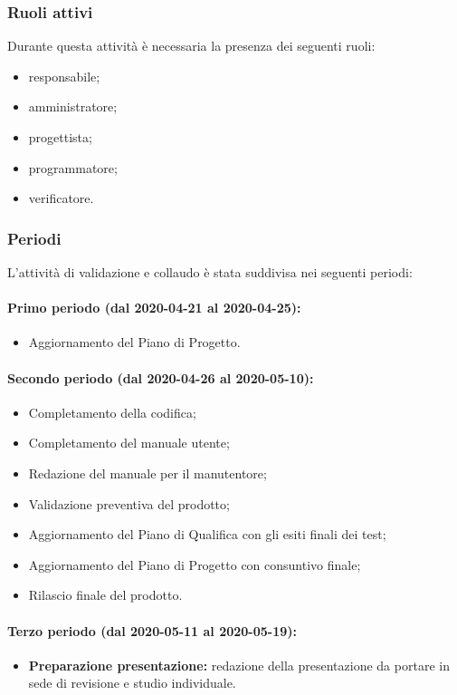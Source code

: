			\subsubsection{Ruoli attivi}
			
			Durante questa attività è necessaria la presenza dei seguenti ruoli:
			\begin{itemize}
				\item responsabile;
				\item amministratore;
				\item progettista;
				\item programmatore;
				\item verificatore.
			\end{itemize}
			
			\subsubsection{Periodi}
			
				L'attività di validazione e collaudo è stata suddivisa nei seguenti periodi:
		
				\paragraph{Primo periodo (dal 2020-04-21 al 2020-04-25):}
				
					\begin{itemize}
					 	\item Aggiornamento del Piano di Progetto.
					\end{itemize} 	
				
				\paragraph{Secondo periodo (dal 2020-04-26 al 2020-05-10):}
				
					\begin{itemize}
						\item Completamento della codifica;
						\item Completamento del manuale utente;
						\item Redazione del manuale per il manutentore;
						\item Validazione preventiva del prodotto;
						\item Aggiornamento del Piano di Qualifica con gli esiti finali dei test;
						\item Aggiornamento del Piano di Progetto con consuntivo finale;
						\item Rilascio finale del prodotto.
					\end{itemize}
		
				\paragraph{Terzo periodo (dal 2020-05-11 al 2020-05-19):}
				
					\begin{itemize}
						\item \textbf{Preparazione presentazione:} redazione della presentazione da portare in sede di revisione e studio individuale.
					\end{itemize}
	
